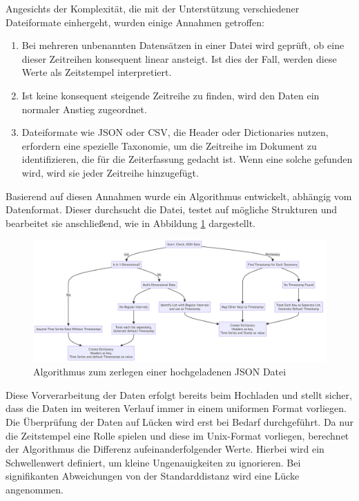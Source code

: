 Angesichts der Komplexität, die mit der Unterstützung verschiedener Dateiformate einhergeht, wurden einige Annahmen getroffen:
\begin{enumerate}
    \item Bei mehreren unbenannten Datensätzen in einer Datei wird geprüft, ob eine dieser Zeitreihen konsequent linear ansteigt. Ist dies der Fall, werden diese Werte als Zeitstempel interpretiert.
    \item Ist keine konsequent steigende Zeitreihe zu finden, wird den Daten ein normaler Anstieg zugeordnet.
    \item Dateiformate wie JSON oder CSV, die Header oder Dictionaries nutzen, erfordern eine spezielle Taxonomie, um die Zeitreihe im Dokument zu identifizieren, die für die Zeiterfassung gedacht ist. Wenn eine solche gefunden wird, wird sie jeder Zeitreihe hinzugefügt.
\end{enumerate}

Basierend auf diesen Annahmen wurde ein Algorithmus entwickelt, abhängig vom Datenformat. Dieser durchsucht die Datei, testet auf mögliche Strukturen und bearbeitet sie anschließend, wie in Abbildung \ref{fig:upload_data} dargestellt.

\begin{figure}[h]
    \centering
    \includegraphics[width=0.9\linewidth]{includes/figures/upload_process.png}
    \caption{Algorithmus zum zerlegen einer hochgeladenen JSON Datei}
\label{fig:upload_data}
\end{figure}



Diese Vorverarbeitung der Daten erfolgt bereits beim Hochladen und stellt sicher, dass die Daten im weiteren Verlauf immer in einem uniformen Format vorliegen. 
Die Überprüfung der Daten auf Lücken wird erst bei Bedarf durchgeführt. Da nur die Zeitstempel eine Rolle spielen und diese im Unix-Format vorliegen, berechnet der Algorithmus die Differenz aufeinanderfolgender Werte. Hierbei wird ein Schwellenwert definiert, um kleine Ungenauigkeiten zu ignorieren. Bei signifikanten Abweichungen von der Standarddistanz wird eine Lücke angenommen.

